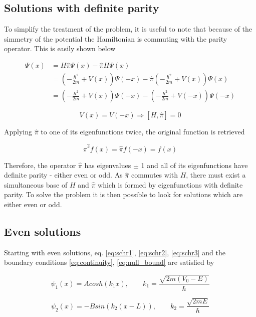\documentclass{article}
\begin{document}
\subsection{Solutions with definite parity}
To simplify the treatment of the problem, it is useful to note that because of the simmetry of the potential the Hamiltonian is commuting with the parity operator. This is easily shown below

\begin{align*}
[H, \hat{\pi}] \Psi(x) & = H \hat{\pi} \Psi(x) - \hat{\pi} H \Psi(x) \\ 
  & = \left(-\frac{\hbar^2}{2m} + V(x)\right)\Psi(-x) -  \hat{\pi} \left(-\frac{\hbar^2}{2m} + V(x)\right)\Psi(x) \\ & = \left(-\frac{\hbar^2}{2m} + V(x)\right)\Psi(-x) -  \left(-\frac{\hbar^2}{2m} + V(-x)\right)\Psi(-x)
\end{align*}

\begin{equation}
\label{eq:parity_commutation}
V(x) = V(-x) \Rightarrow \left[H,\hat{\pi} \right] = 0
\end{equation}

Applying \(\hat{\pi}\) to one of its eigenfunctions twice, the original function is retrieved

\begin{equation}
\hat{\pi}^2f(x) = \hat{\pi}f(-x) = f(x)
\end{equation}

Therefore, the operator \(\hat{\pi}\) has eigenvalues \(\pm\) 1 and all of its eigenfunctions have definite parity - either even or odd. As \(\hat{\pi}\) commutes with \(H\), there must exist a simultaneous base of \(H\) and \(\hat{\pi}\) which is formed by eigenfunctions with definite parity. To solve the problem it is then possible to look for solutions which are either even or odd.

\subsection{Even solutions}
Starting with even solutions, eq. \eqref{eq:schr1}, \eqref{eq:schr2}, \eqref{eq:schr3} and the boundary conditions \eqref{eq:continuity}, \eqref{eq:null_bound} are satisfied by

\begin{equation}
\psi_{1}(x) = A cosh(k_{1} x), \qquad k_{1} = \frac{\sqrt{2m(V_{0} - E)}}{\hbar}
\end{equation}

\begin{equation}
\psi_{2}(x) = - B sin(k_{2}(x-L)), \qquad k_{2} = \frac{\sqrt{2mE}}{\hbar}
\end{equation}
\end{document}
